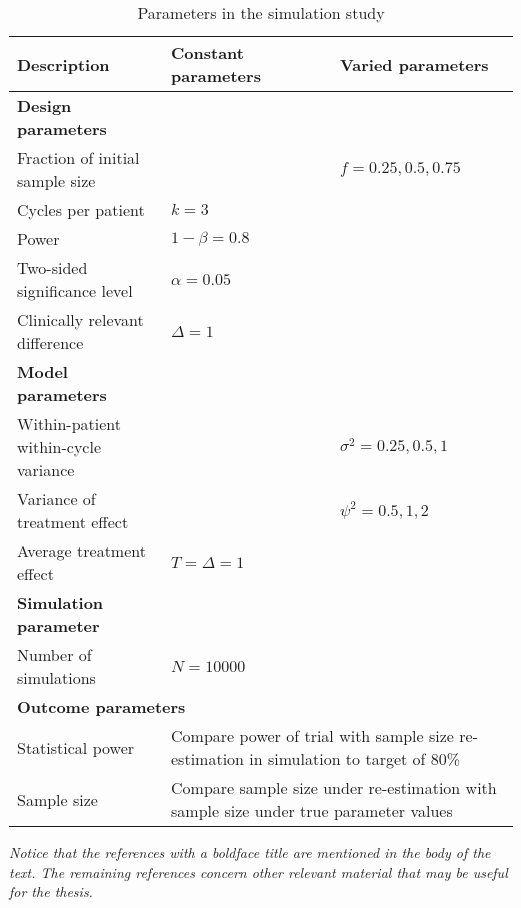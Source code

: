 \documentclass[11pt]{article}
\begin{document}
\begin{table}[h]
\begin{center}
\caption{Parameters in the simulation study}
\begin{tabular}{p{6cm}p{4cm}p{4cm}}
\hline
Description & Constant parameters & Varied parameters \\
\hline 
\textbf{Design parameters} & & \\
Fraction of initial sample size & & $f = 0.25, 0.5, 0.75$ \\
Cycles per patient & $k = 3$ & \\
Power & $1 - \beta = 0.8$ & \\
Two-sided significance level & $\alpha = 0.05$ & \\
Clinically relevant difference & $\Delta = 1$ & \\
\textbf{Model parameters} & & \\
Within-patient within-cycle variance & & $\sigma^2 = 0.25, 0.5, 1$ \\
Variance of treatment effect & & $\psi^2 = 0.5, 1, 2$ \\
Average treatment effect & $T = \Delta = 1$ & \\
\textbf{Simulation parameter} & & \\
Number of simulations & $N = 10000$ & \\
\hline 
\multicolumn{3}{l}{\textbf{Outcome parameters}} \\
Statistical power & \multicolumn{2}{p{8cm}}{Compare power of trial with sample size re-estimation in simulation to target of 80\%}\\
Sample size & \multicolumn{2}{p{8cm}}{Compare sample size under re-estimation with sample size under true parameter values} \\
\hline 
\end{tabular}
\label{tab:T1}
\end{center}
\end{table}


\newpage
\nocite{*}
\printbibliography
\noindent * \textit{Notice that the references with a boldface title are mentioned in the body of the text. The remaining references concern other relevant material that may be useful for the thesis.}
\end{document}
